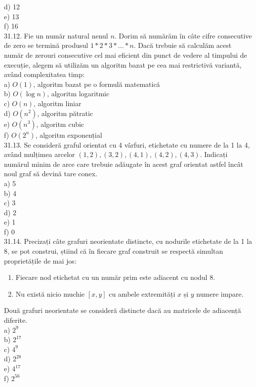 \begin{itemize}
\begin{enumerate}
d) 12
\\
e) 13
\\
f) 16
\\
31.12. Fie un număr natural nenul $n$. Dorim să numărăm în câte cifre consecutive de zero se termină produsul $1 * 2 * 3 * \ldots *n$. Dacă trebuie să calculăm acest număr de zerouri consecutive cel mai eficient din punct de vedere al timpului de execuție, alegem să utilizăm un algoritm bazat pe cea mai restrictivă variantă, având complexitatea timp:
\\
a) $O(1)$, algoritm bazat pe o formulă matematică
\\
b) $O(\log n)$, algoritm logaritmic
\\
c) $O(n)$, algoritm liniar
\\
d) $O(n^{2})$, algoritm pătratic
\\
e) $O(n^{3})$, algoritm cubic
\\
f) $O(2^{n})$, algoritm exponențial
\\
31.13. Se consideră graful orientat cu 4 vârfuri, etichetate cu numere de la 1 la 4, având mulțimea arcelor ${(1,2),(3,2),(4,1),(4,2),(4,3)}$. Indicați numărul minim de arce care trebuie adăugate în acest graf orientat astfel încât noul graf să devină tare conex.
\\
a) 5
\\
b) 4
\\
c) 3
\\
d) 2
\\
e) 1
\\
f) 0
\\
31.14. Precizați câte grafuri neorientate distincte, cu nodurile etichetate de la 1 la 8, se pot construi, știind că în fiecare graf construit se respectă simultan proprietățile de mai jos:
\begin{enumerate}
  \item Fiecare nod etichetat cu un număr prim este adiacent cu nodul 8.
  \item Nu există nicio muchie $[x, y]$ cu ambele extremități $x$ și $y$ numere impare.
\end{enumerate}
Două grafuri neorientate se consideră distincte dacă au matricele de adiacență diferite.
\\
a) $2^{9}$
\\
b) $2^{17}$
\\
c) $4^{9}$
\\
d) $2^{28}$
\\
e) $4^{17}$
\\
f) $2^{56}$
\\

\end{enumerate}
\end{itemize}
